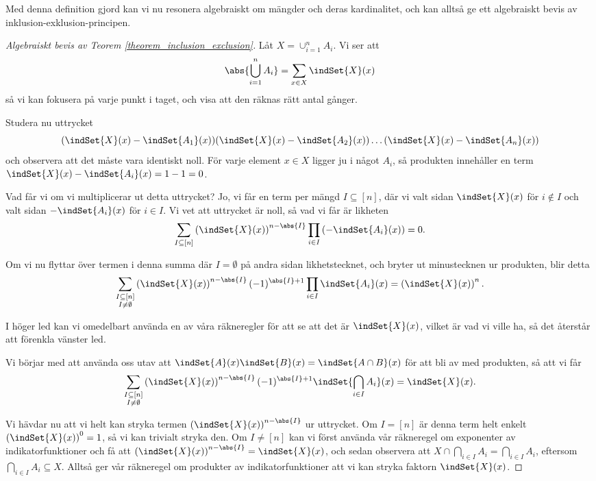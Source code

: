 \documentclass[nobib]{tufte-handout}
\begin{document}
Med denna definition gjord kan vi nu resonera algebraiskt om mängder och deras kardinalitet, och kan alltså ge ett algebraiskt bevis av inklusion-exklusion-principen.

\begin{proof}[Algebraiskt bevis av Teorem \ref{theorem_inclusion_exclusion}]
  Låt $X = \cup_{i=1}^n A_i$. Vi ser att
  $$\abs{\bigcup_{i=1}^n A_i} = \sum_{x \in X} \indSet{X}(x)$$
  så vi kan fokusera på varje punkt i taget, och visa att den räknas rätt antal gånger.

  Studera nu uttrycket
  $$(\indSet{X}(x) - \indSet{A_1}(x))(\indSet{X}(x) - \indSet{A_2}(x))\ldots(\indSet{X}(x) - \indSet{A_n}(x))$$
  och observera att det måste vara identiskt noll. För varje element $x\in X$ ligger ju i något $A_i$, så produkten innehåller en term $\indSet{X}(x) - \indSet{A_i}(x) = 1 - 1 = 0$.

  Vad får vi om vi multiplicerar ut detta uttrycket? Jo, vi får en term per mängd $I \subseteq [n]$, där vi valt sidan $\indSet{X}(x)$ för $i\not\in I$ och valt sidan $-\indSet{A_i}(x)$ för $i \in I$. Vi vet att uttrycket är noll, så vad vi får är likheten
  $$\sum_{I \subseteq [n]} \left(\indSet{X}(x)\right)^{n - \abs{I}}\prod_{i\in I}\left(-\indSet{A_i}(x)\right) = 0.$$

  Om vi nu flyttar över termen i denna summa där $I = \emptyset$ på andra sidan likhetstecknet, och bryter ut minustecknen ur produkten, blir detta
  $$\sum_{\substack{I \subseteq [n]\\I\neq\emptyset}} \left(\indSet{X}(x)\right)^{n - \abs{I}} (-1)^{\abs{I}+1} \prod_{i\in I}\indSet{A_i}(x) = \left(\indSet{X}(x)\right)^n.$$

  I höger led kan vi omedelbart använda en av våra räkneregler för att se att det är $\indSet{X}(x)$, vilket är vad vi ville ha, så det återstår att förenkla vänster led.

  Vi börjar med att använda oss utav att $\indSet{A}(x)\indSet{B}(x) = \indSet{A\cap B}(x)$ för att bli av med produkten, så att vi får
  $$\sum_{\substack{I \subseteq [n]\\I\neq\emptyset}} \left(\indSet{X}(x)\right)^{n - \abs{I}} (-1)^{\abs{I}+1} \indSet{\bigcap_{i\in I} A_i}(x) = \indSet{X}(x).$$

  Vi hävdar nu att vi helt kan stryka termen $\left(\indSet{X}(x)\right)^{n - \abs{I}}$ ur uttrycket. Om $I = [n]$ är denna term helt enkelt $\left(\indSet{X}(x)\right)^0 = 1$, så vi kan trivialt stryka den. Om $I \neq [n]$ kan vi först använda vår räkneregel om exponenter av indikatorfunktioner och få att $\left(\indSet{X}(x)\right)^{n - \abs{I}} = \indSet{X}(x)$, och sedan observera att $X \cap \bigcap_{i\in I} A_i = \bigcap_{i\in I} A_i$, eftersom $\bigcap_{i\in I} A_i \subseteq X$. Alltså ger vår räkneregel om produkter av indikatorfunktioner att vi kan stryka faktorn $\indSet{X}(x)$.


\end{proof}
\end{document}
